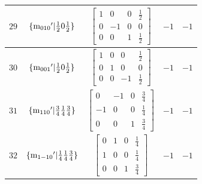 \documentclass[fleqn,8pt]{jsarticle}
\begin{document}
\begin{longtable}{ccccc}
$ 29 $ & $ \{{\rm m}_{010}{}'|\frac{1}{2} 0 \frac{1}{2}\} $ & $ \begin{bmatrix} 1 & 0 & 0 & \frac{1}{2} \\ 0 & -1 & 0 & 0 \\ 0 & 0 & 1 & \frac{1}{2} \end{bmatrix} $ & $ -1 $ & $ -1 $ \\ \hline
$ 30 $ & $ \{{\rm m}_{001}{}'|\frac{1}{2} 0 \frac{1}{2}\} $ & $ \begin{bmatrix} 1 & 0 & 0 & \frac{1}{2} \\ 0 & 1 & 0 & 0 \\ 0 & 0 & -1 & \frac{1}{2} \end{bmatrix} $ & $ -1 $ & $ -1 $ \\ \hline
$ 31 $ & $ \{{\rm m}_{110}{}'|\frac{3}{4} \frac{1}{4} \frac{3}{4}\} $ & $ \begin{bmatrix} 0 & -1 & 0 & \frac{3}{4} \\ -1 & 0 & 0 & \frac{1}{4} \\ 0 & 0 & 1 & \frac{3}{4} \end{bmatrix} $ & $ -1 $ & $ -1 $ \\ \hline
$ 32 $ & $ \{{\rm m}_{1-10}{}'|\frac{1}{4} \frac{1}{4} \frac{3}{4}\} $ & $ \begin{bmatrix} 0 & 1 & 0 & \frac{1}{4} \\ 1 & 0 & 0 & \frac{1}{4} \\ 0 & 0 & 1 & \frac{3}{4} \end{bmatrix} $ & $ -1 $ & $ -1 $ \\
\end{longtable}
\end{document}
